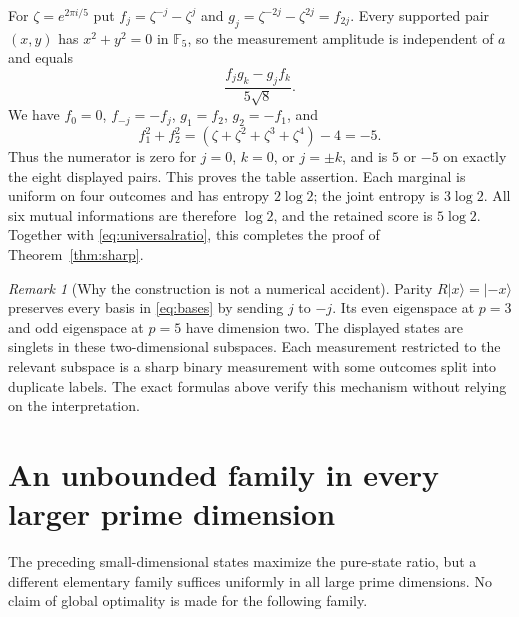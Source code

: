 \documentclass[11pt]{article}
\theoremstyle{remark}
\newtheorem{remark}[theorem]{Remark}
\newcommand{\F}{\mathbb F}
\newcommand{\ket}[1]{\lvert #1\rangle}
\begin{document}
For $\zeta=e^{2\pi i/5}$ put $f_j=\zeta^{-j}-\zeta^j$ and
$g_j=\zeta^{-2j}-\zeta^{2j}=f_{2j}$. Every supported pair $(x,y)$ has $x^2+y^2=0$ in $\F_5$, so the measurement amplitude is independent of $a$ and equals
\[
 \frac{f_jg_k-g_jf_k}{5\sqrt8}.
\]
We have $f_0=0$, $f_{-j}=-f_j$, $g_1=f_2$, $g_2=-f_1$, and
\[
 f_1^2+f_2^2=(\zeta+\zeta^2+\zeta^3+\zeta^4)-4=-5.
\]
Thus the numerator is zero for $j=0$, $k=0$, or $j=\pm k$, and is $5$ or $-5$ on exactly the eight displayed pairs. This proves the table assertion.
Each marginal is uniform on four outcomes and has entropy $2\log2$; the joint entropy is $3\log2$. All six mutual informations are therefore $\log2$, and the retained score is $5\log2$. Together with \eqref{eq:universalratio}, this completes the proof of Theorem~\ref{thm:sharp}.

\begin{remark}[Why the construction is not a numerical accident]
Parity $R\ket{x}=\ket{-x}$ preserves every basis in \eqref{eq:bases} by sending $j$ to $-j$. Its even eigenspace at $p=3$ and odd eigenspace at $p=5$ have dimension two. The displayed states are singlets in these two-dimensional subspaces. Each measurement restricted to the relevant subspace is a sharp binary measurement with some outcomes split into duplicate labels. The exact formulas above verify this mechanism without relying on the interpretation.
\end{remark}

\section{An unbounded family in every larger prime dimension}
The preceding small-dimensional states maximize the pure-state ratio, but a different elementary family suffices uniformly in all large prime dimensions. No claim of global optimality is made for the following family.
\end{document}

